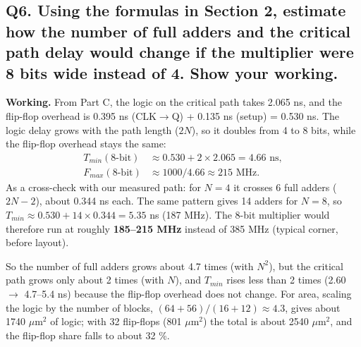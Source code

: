 \documentclass[10pt,a4paper,twocolumn]{article}
\newcommand{\umsq}{$\mu$m$^2$}
\begin{document}
\subsection*{Q6. Using the formulas in Section 2, estimate how the number of full adders and the critical path delay would change if the multiplier were 8 bits wide instead of 4. Show your working.}

\begin{table}[H]
\centering
{}
\caption{Scaling from 4 to 8 bits.}
\end{table}

\textbf{Working.} From Part C, the logic on the critical path takes 2.065 ns, and the flip-flop overhead is
0.395 ns (CLK$\rightarrow$Q) + 0.135 ns (setup) = 0.530 ns. The logic delay grows with the path length ($2N$),
so it doubles from 4 to 8 bits, while the flip-flop overhead stays the same:
\begin{align*}
T_{min}(8\text{-bit}) &\approx 0.530 + 2 \times 2.065 = 4.66 \text{ ns},\\
F_{max}(8\text{-bit}) &\approx 1000 / 4.66 \approx 215 \text{ MHz}.
\end{align*}
As a cross-check with our measured path: for $N = 4$ it crosses 6 full adders ($2N - 2$), about 0.344 ns each.
The same pattern gives 14 adders for $N = 8$, so $T_{min} \approx 0.530 + 14 \times 0.344 = 5.35$ ns
(187 MHz). The 8-bit multiplier would therefore run at roughly \textbf{185--215 MHz} instead of 385 MHz
(typical corner, before layout).

So the number of full adders grows about 4.7 times (with $N^2$), but the critical path grows only about 2 times
(with $N$), and $T_{min}$ rises less than 2 times (2.60 $\rightarrow$ 4.7--5.4 ns) because the flip-flop overhead
does not change. For area, scaling the logic by the number of blocks, $(64 + 56)/(16 + 12) \approx 4.3$, gives
about 1740 \umsq{} of logic; with 32 flip-flops (801 \umsq) the total is about 2540 \umsq{}, and the flip-flop share
falls to about 32 \%.
\end{document}
